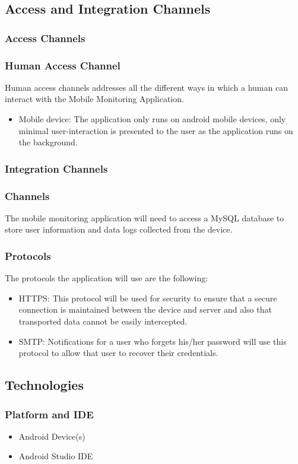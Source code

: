 \documentclass[hidelinks, 12pt, oneside]{article}
\begin{document}
	\subsection{Access and Integration Channels}
	\subsubsection{Access Channels}
	\subsubsection*{Human Access Channel}
	Human access channels addresses all the different ways in which a human can interact with the Mobile Monitoring Application.
	\begin{itemize}
		\item Mobile device: The application only runs on android mobile devices, only minimal user-interaction is presented to the user as the application runs on the background.   
	\end{itemize}
	\subsubsection{Integration Channels}
	\subsubsection*{Channels}
	The mobile monitoring application will need to access a MySQL database to store user information and data logs collected from the device.    	\subsubsection*{Protocols}
	The protocols the application will use are the following:
	\begin{itemize}
	\item HTTPS: This protocol will be used for security to ensure that a secure connection is maintained between the device and server and also that transported data cannot be easily intercepted.
	\item SMTP: Notifications for a user who forgets his/her password will use this protocol to allow that user to recover their credentials.  
	\end{itemize}	 
	\newpage
	\subsection{Technologies}
	\subsubsection{Platform and IDE}
	\begin{itemize}
	\item Android Device(s)
	\item Android Studio IDE
	\end{itemize}
\end{document}
